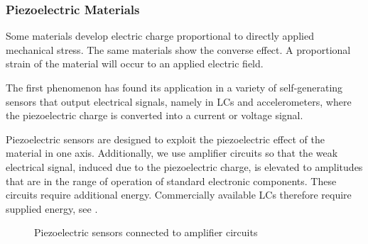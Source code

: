 \subsubsection{Piezoelectric Materials}
Some materials develop electric charge proportional to directly applied mechanical stress. The same materials show the converse effect. A proportional strain of the material will occur to an applied electric field.

The first phenomenon has found its application in a variety of self-generating sensors that output electrical signals, namely in \ac{LC}s and accelerometers, where the piezoelectric charge is converted into a current or voltage signal.

Piezoelectric sensors are designed to exploit the piezoelectric effect of the material in one axis. Additionally, we use amplifier circuits so that the weak electrical signal, induced due to the piezoelectric charge, is elevated to amplitudes that are in the range of operation of standard electronic components. These circuits require additional energy. Commercially available \ac{LC}s therefore require supplied energy, see .

\begin{figure}[!htb]
  \centering
  \hspace{4em}
  \caption[Piezoelectric sensors in amplifier circuits]{Piezoelectric sensors connected to amplifier circuits~\cite{webster2018measurement}%
    \label{fig:piezo_ampcirc}}
\end{figure}

